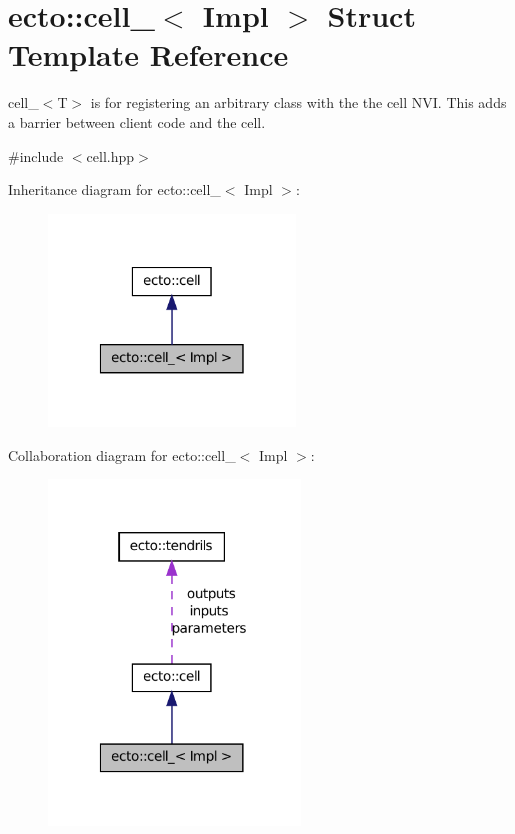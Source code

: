 \hypertarget{structecto_1_1cell__}{\section{ecto\-:\-:cell\-\_\-$<$ \-Impl $>$ \-Struct \-Template \-Reference}
\label{structecto_1_1cell__}
}


cell\-\_\-$<$\-T$>$ is for registering an arbitrary class with the the cell \-N\-V\-I. \-This adds a barrier between client code and the cell.  




{\ttfamily \#include $<$cell.\-hpp$>$}



\-Inheritance diagram for ecto\-:\-:cell\-\_\-$<$ \-Impl $>$\-:\nopagebreak
\begin{figure}[H]
\begin{center}
\leavevmode
\includegraphics[width=186pt]{structecto_1_1cell____inherit__graph}
\end{center}
\end{figure}


\-Collaboration diagram for ecto\-:\-:cell\-\_\-$<$ \-Impl $>$\-:\nopagebreak
\begin{figure}[H]
\begin{center}
\leavevmode
\includegraphics[width=190pt]{structecto_1_1cell____coll__graph}
\end{center}
\end{figure}
